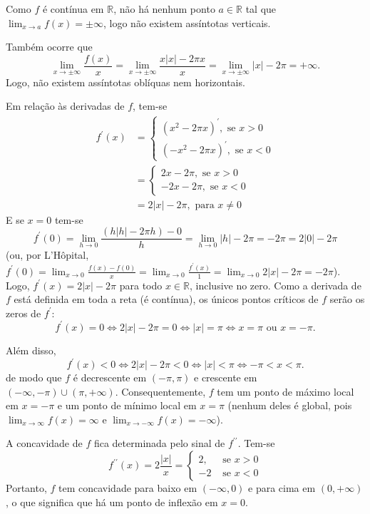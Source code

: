 \documentclass[12pt,a4paper]{article}
\newcommand*\abs[1]{\left|#1\right|}
\newcommand*\R{\mathbb{R}}
\begin{document}
\begin{enumerate}
Como $f$ é contínua em $\R$, não há nenhum ponto $a \in \R$ tal que $\lim_{x\to a} f(x) = \pm \infty$, logo não existem assíntotas verticais.

Também ocorre que
\[
\lim_{x\to \pm\infty} \frac{ f(x) }{x}
= \lim_{x\to \pm\infty} \frac{ x\abs{x} - 2\pi x }{x}
= \lim_{x\to \pm\infty} \abs{x} - 2\pi
= +\infty.
\]
Logo, não existem assíntotas oblíquas nem horizontais.

Em relação às derivadas de $f$, tem-se
\begin{align*}
f^\prime(x)
& = \begin{cases}
(x^2-2\pi x)^\prime, \text{ se } x > 0 \\
(-x^2-2\pi x)^\prime, \text{ se } x < 0
\end{cases} \\
& = \begin{cases}
2x-2\pi, \text{ se } x > 0 \\
-2x-2\pi, \text{ se } x < 0
\end{cases} \\
& = 2\abs{x} - 2\pi, \text{ para } x \neq 0
\end{align*}
E se $x=0$ tem-se
\[
f^\prime(0)
= \lim_{h\to 0} \frac{ (h\abs{h} - 2\pi h) - 0 }{h}
= \lim_{h\to 0} \abs{h} - 2\pi
= - 2\pi
= 2 \abs{0} - 2\pi
\]
(ou, por L'Hôpital,
$f^\prime(0)
= \lim_{x \to 0} \frac{f(x) - f(0)}{x}
= \lim_{x \to 0} \frac{f^\prime(x)}{1}
= \lim_{x \to 0} 2\abs{x} - 2\pi = - 2\pi$).
Logo, $f^\prime(x) = 2 \abs{x} - 2\pi$ para todo $x \in \R$, inclusive no zero. Como a derivada de $f$ está definida em toda a reta (é contínua), os únicos pontos críticos de $f$ serão os zeros de $f^\prime$:
\[
f^\prime(x) = 0
\Leftrightarrow 2 \abs{x} - 2\pi = 0
\Leftrightarrow \abs{x} = \pi
\Leftrightarrow x = \pi \text{ ou } x = -\pi.
\]

Além disso,
\[
f^\prime(x) < 0
\Leftrightarrow 2 \abs{x} - 2\pi < 0
\Leftrightarrow \abs{x} < \pi
\Leftrightarrow -\pi < x < \pi.
\]
de modo que $f$ é decrescente em $(-\pi, \pi)$ e crescente em $(-\infty, -\pi) \cup (\pi, +\infty)$. Consequentemente, $f$ tem um ponto de máximo local em $x=-\pi$ e um ponto de mínimo local em $x=\pi$ (nenhum deles é global, pois $\lim_{x\to \infty} f(x) = \infty$ e $\lim_{x\to -\infty} f(x) = -\infty$).
\begin{minipage}[b]{0.67\linewidth}
A concavidade de $f$ fica determinada pelo sinal de $f^{\prime\prime}$. Tem-se
\[
f^{\prime\prime}(x)
= 2\frac{\abs{x}}{x}
= \begin{cases}
2, & \text{ se } x > 0\\
-2 & \text{ se } x < 0
\end{cases}
\]
Portanto, $f$ tem concavidade para baixo em $(-\infty, 0)$ e para cima em $(0, +\infty)$, o que significa que há um ponto de inflexão em $x=0$.


\end{minipage}
\end{enumerate}
\end{document}
